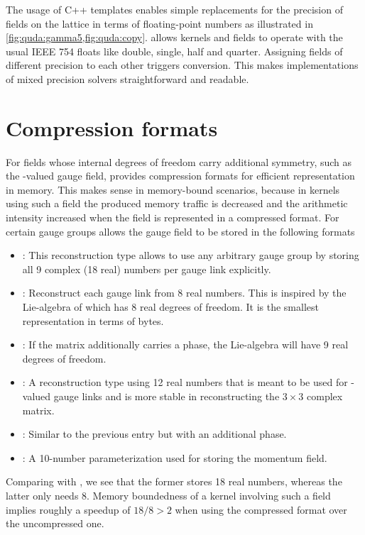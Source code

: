 The usage of C++ templates enables simple replacements for the precision of fields on the lattice in terms of floating-point numbers as illustrated in \cref{fig:quda:gamma5,fig:quda:copy}. \Quda allows kernels and fields to operate with the usual IEEE 754 floats like double, single, half and quarter. Assigning fields of different precision to each other triggers conversion. This makes implementations of mixed precision solvers straightforward and readable.

\section{Compression formats}
\label{quda:compresed:formats}

For fields whose internal degrees of freedom carry additional symmetry, such as the -valued gauge field, \quda provides compression formats for efficient representation in memory.
This makes sense in memory-bound scenarios, because in kernels using such a field the produced memory traffic is decreased and the arithmetic intensity increased when the field is represented in a compressed format.
For certain gauge groups \quda allows the gauge field to be stored in the following formats
\begin{itemize}
  \item {}: This reconstruction type allows to use any arbitrary gauge group by storing all \num{9} complex (\num{18} real) numbers per gauge link explicitly.
  \item {}: Reconstruct each gauge link from \num{8} real numbers. This is inspired by the Lie-algebra of  which has \num{8} real degrees of freedom. It is the smallest representation in terms of bytes.
  \item {}: If the  matrix additionally carries a  phase, the Lie-algebra will have \num{9} real degrees of freedom.
  \item {}: A reconstruction type using \num{12} real numbers that is meant to be used for -valued gauge links and is more stable in reconstructing the $3 \times 3$ complex matrix.
  \item {}: Similar to the previous entry but with an additional  phase.
  \item {}: A \num{10}-number parameterization used for storing the momentum field.
\end{itemize}
Comparing  with , we see that the former stores \num{18} real numbers, whereas the latter only needs \num{8}. Memory boundedness of a kernel involving such a field implies roughly a speedup of $18/8 > 2$ when using the compressed format over the uncompressed one.

